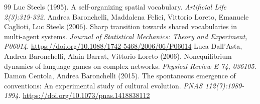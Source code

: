 \documentclass[11pt,a4paper]{article}
\begin{document}
\begin{thebibliography}{99}
 Luc Steels (1995). A self-organizing spatial vocabulary. \emph{Artificial Life 2(3):319-332}.
 Andrea Baronchelli, Maddalena Felici, Vittorio Loreto, Emanuele Caglioti, Luc Steels (2006). Sharp transition towards shared vocabularies in multi-agent systems. \emph{Journal of Statistical Mechanics: Theory and Experiment, P06014}. \url{https://doi.org/10.1088/1742-5468/2006/06/P06014}
 Luca Dall'Asta, Andrea Baronchelli, Alain Barrat, Vittorio Loreto (2006). Nonequilibrium dynamics of language games on complex networks. \emph{Physical Review E 74, 036105}.
 Damon Centola, Andrea Baronchelli (2015). The spontaneous emergence of conventions: An experimental study of cultural evolution. \emph{PNAS 112(7):1989-1994}. \url{https://doi.org/10.1073/pnas.1418838112}
\end{thebibliography}
\end{document}

